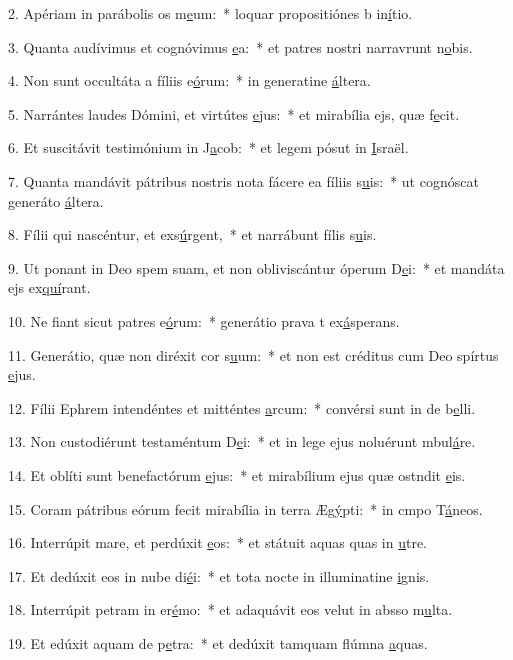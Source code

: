 2. Apériam in parábolis os m\uline{e}um:~* loquar propositiónes b in\uline{í}tio.\par 
3. Quanta audívimus et cognóvimus \uline{e}a:~* et patres nostri narravrunt n\uline{o}bis.\par 
4. Non sunt occultáta a fíliis e\uline{ó}rum:~* in generatine \uline{á}ltera.\par 
5. Narrántes laudes Dómini, et virtútes \uline{e}jus:~* et mirabília ejs, quæ f\uline{e}cit.\par 
6. Et suscitávit testimónium in J\uline{a}cob:~* et legem pósut in \uline{I}sraël.\par 
7. Quanta mandávit pátribus nostris nota fácere ea fíliis s\uline{u}is:~* ut cognóscat generáto \uline{á}ltera.\par 
8. Fílii qui nascéntur, et exs\uline{ú}rgent,~* et narrábunt fílis s\uline{u}is.\par 
9. Ut ponant in Deo spem suam, et non obliviscántur óperum D\uline{e}i:~* et mandáta ejs ex\uline{quí}rant.\par 
10. Ne fiant sicut patres e\uline{ó}rum:~* generátio prava t ex\uline{á}sperans.\par 
11. Generátio, quæ non diréxit cor s\uline{u}um:~* et non est créditus cum Deo spírtus \uline{e}jus.\par 
12. Fílii Ephrem intendéntes et mitténtes \uline{a}rcum:~* convérsi sunt in de b\uline{e}lli.\par 
13. Non custodiérunt testaméntum D\uline{e}i:~* et in lege ejus noluérunt mbul\uline{á}re.\par 
14. Et oblíti sunt benefactórum \uline{e}jus:~* et mirabílium ejus quæ ostndit \uline{e}is.\par 
15. Coram pátribus eórum fecit mirabília in terra Æg\uline{ý}pti:~* in cmpo T\uline{á}neos.\par 
16. Interrúpit mare, et perdúxit \uline{e}os:~* et státuit aquas quas in \uline{u}tre.\par 
17. Et dedúxit eos in nube di\uline{é}i:~* et tota nocte in illuminatine \uline{i}gnis.\par 
18. Interrúpit petram in er\uline{é}mo:~* et adaquávit eos velut in absso m\uline{u}lta.\par 
19. Et edúxit aquam de p\uline{e}tra:~* et dedúxit tamquam flúmna \uline{a}quas.\par 

